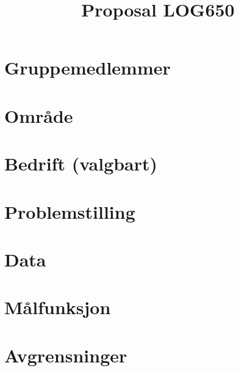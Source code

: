 \documentclass[a4paper,12pt]{article}
\title{Proposal LOG650}
\author{}
\date{}
\begin{document}
\maketitle

\section*{Gruppemedlemmer}

\section*{Område}

\section*{Bedrift (valgbart)}

\section*{Problemstilling}

\section*{Data}

\section*{Målfunksjon}

\section*{Avgrensninger}
\end{document}
